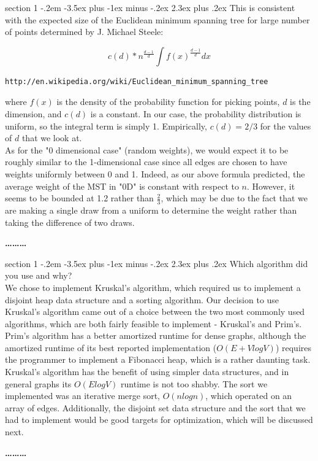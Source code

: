 \documentclass[12pt]{article}
\makeatletter
\newenvironment{problem}{\@startsection
       {section}
       {1}
       {-.2em}
       {-3.5ex plus -1ex minus -.2ex}
       {2.3ex plus .2ex}
       {\pagebreak[3]%
       \large\bf\noindent{Problem }
       }
       }
       {%
       \begin{center}\large\bf \ldots\ldots\ldots\end{center}}
\makeatother
\begin{document}
\begin{problem}{}
\noindent This is consistent with the expected size of the Euclidean
minimum spanning tree for large number of points determined by
J. Michael Steele:

$$c(d)*n^{\frac{d-1}{d}}\int{f(x)^{\frac{d-1}{d}}dx}$$
\begin{verbatim}
http://en.wikipedia.org/wiki/Euclidean_minimum_spanning_tree
\end{verbatim}
where $f(x)$ is the density of the probability function for picking
points, $d$ is the dimension, and $c(d)$ is a constant. In our case,
the probability distribution is uniform, so the integral term is
simply 1. Empirically, $c(d)=2/3$ for the values of $d$ that we look at.\\

\noindent As for the "0 dimensional case" (random weights), we would expect it to be roughly similar to the 1-dimensional case since all edges are chosen to have weights uniformly between 0 and 1.  Indeed, as our above formula predicted, the average weight of the MST in "0D" is constant with respect to $n$.  However, it seems to be bounded at 1.2 rather than $\frac{2}{3}$, which may be due to the fact that we are making a single draw from a uniform to determine the weight rather than taking the difference of two draws.

\end{problem}

\begin{problem}{}
Which algorithm did you use and why?\\

\noindent We chose to implement Kruskal's algorithm, which required us to implement a disjoint heap data structure and a sorting algorithm.  Our decision to use Kruskal's algorithm came out of a choice between the two most commonly used algorithms, which are both fairly feasible to implement - Kruskal's and Prim's.\\

\noindent Prim's algorithm has a better amortized runtime for dense
graphs, although the amortized runtime of its best reported
implementation ($O(E + VlogV)$) requires the programmer to implement a
Fibonacci heap, which is a rather daunting task.  Kruskal's algorithm
has the benefit of using simpler data structures, and in general
graphs its $O(ElogV)$ runtime is not too shabby. The sort we
implemented was an iterative merge sort, $O(nlog n)$, which operated
on an array of edges. Additionally, the 
disjoint set data structure and the sort that we had to implement
would be good targets for optimization, which will be discussed next. 

\end{problem}
\end{document}
